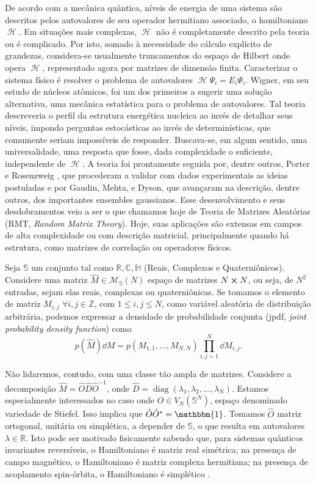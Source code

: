 \documentclass[11pt,twocolumn]{article}
\newcommand{\matriz}[1]{\hat#1}
\newcommand{\mmany}[2]{ #1_1, #1_2, \dots, #1_#2 }
\DeclareMathOperator{\diag}{diag}
\DeclareMathOperator{\Hf}{\mathcal{H}}
\newcommand{\C}{\mathbb{C}}
\newcommand{\R}{\mathbb{R}}
\newcommand{\Z}{\mathbb{Z}}
\newcommand{\p}{p} %
\newcommand{\Se}{\mathbb{S}}
\newcommand{\He}{\mathbb{H}}
\numberwithin{equation}{section} %
\begin{document}
De acordo com a mecânica quântica, níveis de energia de uma sistema são descritos pelos autovalores de seu operador hermitiano associado, o hamiltoniano $\Hf$. Em situações mais complexas, $\Hf$ não é completamente descrito pela teoria ou é complicado. Por isto, somado à necessidade do cálculo explícito de grandezas, considera-se usualmente truncamentos do espaço de Hilbert onde opera $\Hf$, representado agora por matrizes de dimensão finita. Caracterizar o sistema físico é resolver o problema de autovalores $\Hf \Psi_i = E_i \Psi_i$. Wigner, em seu estudo de núcleos atômicos, foi um dos primeiros a sugerir uma solução alternativa, uma mecânica estatística para o problema de autovalores. Tal teoria descreveria o perfil da estrutura energética nucleica ao invés de detalhar seus níveis, impondo perguntas estocásticas ao invés de determinísticas, que comumente seriam impossíveis de responder. Buscava-se, em algum sentido, uma universalidade, uma resposta que fosse, dada complexidade o suficiente, independente de $\Hf$. A teoria foi prontamente seguida por, dentre outros, Porter e Rosenzweig , que procederam a validar com dados experimentais as ideias postuladas e por Gaudin, Mehta, e Dyson, que avançaram na descrição, dentre outros, dos importantes ensembles gaussianos. Esse desenvolvimento e seus desdobramentos veio a ser o que chamamos hoje de Teoria de Matrizes Aleatórias (RMT, \textit{Random Matrix Theory}). Hoje, suas aplicações são extensas em campos de alta complexidade ou com descrição matricial, principalmente quando há estrutura, como matrizes de correlação ou operadores físicos.

Seja $\Se$ um conjunto tal como $\R, \C, \He $ (Reais, Complexos e Quaterniônicos). Considere uma matriz $\matriz{M} \in \mathcal{M}_{\Se}(N)$ espaço de matrizes $N \cross N$, ou seja, de $N^2$ entradas, sejam elas reais, complexas ou quaterniônicas. Se tomamos o elemento de matriz $M_{i,j}$ $\forall i, j \in \Z$, com $1 \leq i, j \leq N$, como variável aleatória de distribuição arbitrária, podemos expressar a densidade de probabilidade conjunta (jpdf, \textit{joint probability density function}) como $$\p(\hat{M}) \dd M = \p(M_{1,1}, \dots, M_{N,N}) \prod_{i,j=1}^{N} \dd M_{i,j}.$$

Não lidaremos, contudo, com uma classe tão ampla de matrizes. Considere a decomposição $\matriz{M} = \matriz{O} \matriz{D} \matriz{O}^{-1}$, onde $\matriz{D} = \diag(\mmany{\lambda}{N})$. Estamos especialmente interessados no caso onde $\matriz{O} \in V_N(\Se^N)$, espaço denominado variedade de Stiefel. Isso implica que $ \matriz{O} \matriz{O}^* = \mathbbm{1}$. Tomamos $\matriz{O}$ matriz ortogonal, unitária ou simplética, a depender de $\Se$, o que resulta em autovalores $\lambda \in \R$. Isto pode ser motivado fisicamente sabendo que, para sistemas quânticos invariantes reversíveis, o Hamiltoniano é matriz real simétrica; na presença de campo magnético, o Hamiltoniano é matriz complexa hermitiana; na presença de acoplamento spin-órbita, o Hamiltoniano é simplético \cite[Capítulo~2]{RMT-firstcourse-Potters}.
\end{document}
